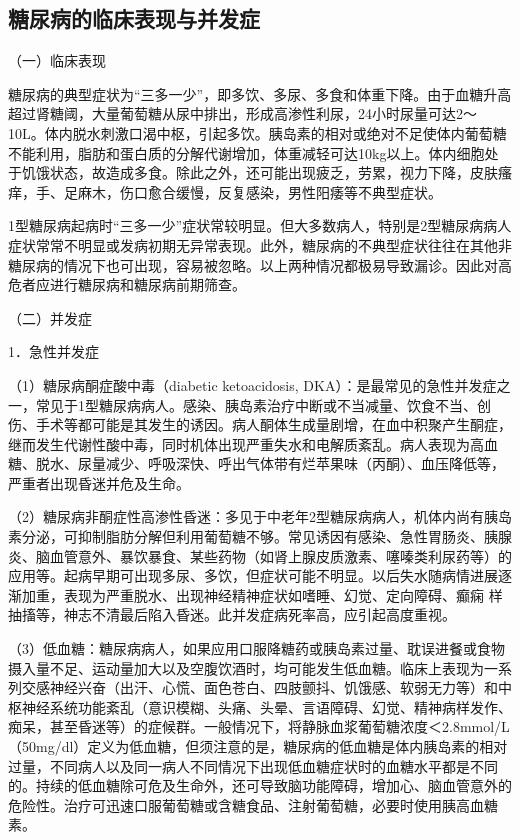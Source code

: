 \hypertarget{text00004.htmlux5cux23mllj22}{%
\subsection{糖尿病的临床表现与并发症}\label{text00004.htmlux5cux23mllj22}}

（一）临床表现

糖尿病的典型症状为“三多一少”，即多饮、多尿、多食和体重下降。由于血糖升高超过肾糖阈，大量葡萄糖从尿中排出，形成高渗性利尿，24小时尿量可达2～10L。体内脱水刺激口渴中枢，引起多饮。胰岛素的相对或绝对不足使体内葡萄糖不能利用，脂肪和蛋白质的分解代谢增加，体重减轻可达10kg以上。体内细胞处于饥饿状态，故造成多食。除此之外，还可能出现疲乏，劳累，视力下降，皮肤瘙痒，手、足麻木，伤口愈合缓慢，反复感染，男性阳痿等不典型症状。

1型糖尿病起病时“三多一少”症状常较明显。但大多数病人，特别是2型糖尿病病人症状常常不明显或发病初期无异常表现。此外，糖尿病的不典型症状往往在其他非糖尿病的情况下也可出现，容易被忽略。以上两种情况都极易导致漏诊。因此对高危者应进行糖尿病和糖尿病前期筛查。

（二）并发症

{1．急性并发症}

（1）糖尿病酮症酸中毒（diabetic ketoacidosis,
DKA）：是最常见的急性并发症之一，常见于1型糖尿病病人。感染、胰岛素治疗中断或不当减量、饮食不当、创伤、手术等都可能是其发生的诱因。病人酮体生成量剧增，在血中积聚产生酮症，继而发生代谢性酸中毒，同时机体出现严重失水和电解质紊乱。病人表现为高血糖、脱水、尿量减少、呼吸深快、呼出气体带有烂苹果味（丙酮）、血压降低等，严重者出现昏迷并危及生命。

（2）糖尿病非酮症性高渗性昏迷：多见于中老年2型糖尿病病人，机体内尚有胰岛素分泌，可抑制脂肪分解但利用葡萄糖不够。常见诱因有感染、急性胃肠炎、胰腺炎、脑血管意外、暴饮暴食、某些药物（如肾上腺皮质激素、噻嗪类利尿药等）的应用等。起病早期可出现多尿、多饮，但症状可能不明显。以后失水随病情进展逐渐加重，表现为严重脱水、出现神经精神症状如嗜睡、幻觉、定向障碍、癫痫
样抽搐等，神志不清最后陷入昏迷。此并发症病死率高，应引起高度重视。

（3）低血糖：糖尿病病人，如果应用口服降糖药或胰岛素过量、耽误进餐或食物摄入量不足、运动量加大以及空腹饮酒时，均可能发生低血糖。临床上表现为一系列交感神经兴奋（出汗、心慌、面色苍白、四肢颤抖、饥饿感、软弱无力等）和中枢神经系统功能紊乱（意识模糊、头痛、头晕、言语障碍、幻觉、精神病样发作、痴呆，甚至昏迷等）的症候群。一般情况下，将静脉血浆葡萄糖浓度＜2.8mmol/L（50mg/dl）定义为低血糖，但须注意的是，糖尿病的低血糖是体内胰岛素的相对过量，不同病人以及同一病人不同情况下出现低血糖症状时的血糖水平都是不同的。持续的低血糖除可危及生命外，还可导致脑功能障碍，增加心、脑血管意外的危险性。治疗可迅速口服葡萄糖或含糖食品、注射葡萄糖，必要时使用胰高血糖素。

